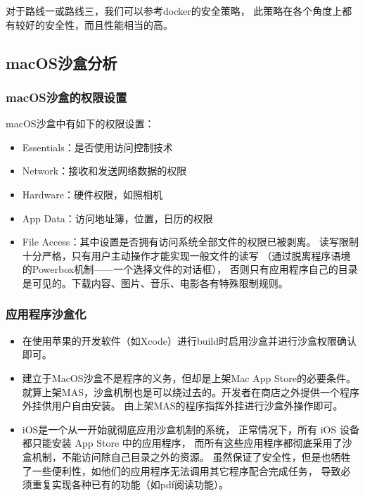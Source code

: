 \documentclass[AutoFakeBold,a4paper]{ctexart}
\begin{document}
对于路线一或路线三，我们可以参考docker的安全策略，
此策略在各个角度上都有较好的安全性，而且性能相当的高。

\subsection{macOS沙盒分析}

\subsubsection{macOS沙盒的权限设置}

macOS沙盒中有如下的权限设置\cite{hoog2011iphone}：

\begin{itemize}
    \item Essentials：是否使用访问控制技术
    \item Network：接收和发送网络数据的权限
    \item Hardware：硬件权限，如照相机
    \item App Data：访问地址簿，位置，日历的权限
    \item File Access：其中设置是否拥有访问系统全部文件的权限已被剥离。
    读写限制十分严格，只有用户主动操作才能实现一般文件的读写
    （通过脱离程序语境的Powerbox机制——一个选择文件的对话框），
    否则只有应用程序自己的目录是可见的。下载内容、图片、音乐、电影各有特殊限制规则。
\end{itemize}

\subsubsection{应用程序沙盒化}

\begin{itemize}
    \item 在使用苹果的开发软件（如Xcode）进行build时启用沙盒并进行沙盒权限确认即可。
    \item 建立于MacOS沙盒不是程序的义务，但却是上架Mac App Store的必要条件。
    就算上架MAS，沙盒机制也是可以绕过去的。开发者在商店之外提供一个程序外挂供用户自由安装。
    由上架MAS的程序指挥外挂进行沙盒外操作即可。
    \item iOS是一个从一开始就彻底应用沙盒机制的系统，
    正常情况下，所有 iOS 设备都只能安装 App Store 中的应用程序，
    而所有这些应用程序都彻底采用了沙盒机制，不能访问除自己目录之外的资源。
    虽然保证了安全性，但是也牺牲了一些便利性，如他们的应用程序无法调用其它程序配合完成任务，
    导致必须重复实现各种已有的功能（如pdf阅读功能）。
\end{itemize}
\end{document}
